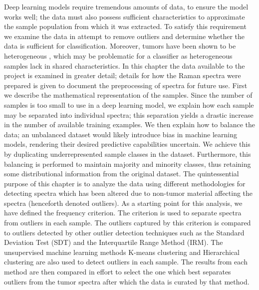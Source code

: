 Deep learning models require tremendous amounts of data, to ensure the model works well; the data must also possess sufficient characteristics to approximate the sample population from which it was extracted. To satisfy this requirement we examine the data in attempt to remove outliers and determine whether the data is sufficient for classification. Moreover, tumors have been shown to be heterogeneous \cite{friedmann2014glioblastoma}, which may be problematic for a classifier as heterogeneous samples lack in shared characteristics. In this chapter the data available to the project is examined in greater detail; details for how the Raman spectra were prepared is given to document the preprocessing of spectra for future use. First we describe the mathematical representation of the samples. Since the number of samples is too small to use in a deep learning model, we explain how each sample may be separated into individual spectra; this separation yields a drastic increase in the number of available training examples. We then explain how to balance the data; an unbalanced dataset would likely introduce bias in machine learning models, rendering their desired predictive capabilities uncertain. We achieve this by duplicating underrepresented sample classes in the dataset. Furthermore, this balancing is performed to maintain majority and minority classes, thus retaining some distributional information from the original dataset. The quintessential purpose of this chapter is to analyze the data using different methodologies for detecting spectra which has been altered due to non-tumor material affecting the spectra (henceforth denoted outliers). As a starting point for this analysis, we have defined the frequency criterion. The criterion is used to separate spectra from outliers in each sample. The outliers captured by this criterion is compared to outliers detected by other outlier detection techniques such as the Standard Deviation Test (SDT) and the Interquartile Range Method (IRM). The unsupervised machine learning methods K-means clustering and Hierarchical clustering are also used to detect outliers in each sample. The results from each method are then compared in effort to select the one which best separates outliers from the tumor spectra after which the data is curated by that method.

